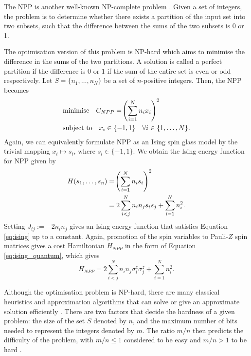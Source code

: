         The NPP is another well-known NP-complete problem \cite{karp2010reducibility}. Given a set of integers, the problem is to determine whether there exists a partition of the input set into two subsets, such that the difference between the sums of the two subsets is 0 or 1.

        The optimisation version of this problem is NP-hard which aims to minimise the difference in the sums of the two partitions. A solution is called a perfect partition if the difference is 0 or 1 if the sum of the entire set is even or odd respectively. Let $S=\{n_1,\dots,n_N\}$ be a set of $n$-positive integers. Then, the NPP becomes
        \begin{align}
        \begin{split}
                &\text{minimise} \quad  C_{NPP}=\lr(){\sum_{i=1}^Nn_ix_i}^2 \\
                &\text{subject to} \quad x_i\in\{-1,1\}\quad\forall i\in\{1,\dots,N\}.
        \end{split}
        \end{align}
        Again, we can equivalently formulate NPP as an Ising spin glass model by the trivial mapping $x_i\mapsto s_i$, where $s_i\in\{-1,1\}$. We obtain the Ising energy function for NPP given by 
        \begin{align}
            \begin{split}
                H(s_1,\dots,s_n) &= \lr(){\sum^N_{i=1}n_is_i}^2 \\
                &= 2\sum^N_{i<j} n_in_js_is_j + \sum^N_{i=1}n_i^2.
            \end{split}
        \end{align}
        Setting $J_{ij}:=-2n_in_j$ gives an Ising energy function that satisfies Equation \ref{eq:ising} up to a constant. Again, promotion of the spin variables to Pauli-$Z$ spin matrices gives a cost Hamiltonian $H_{NPP}$ in the form of Equation \ref{eq:ising_quantum}, which gives
        \begin{equation}
            H_{NPP} = 2\sum^N_{i<j} n_in_j\sigma^z_i\sigma^z_j + \sum^N_{i=1}n_i^2.
        \end{equation}

        Although the optimisation problem is NP-hard, there are many classical heuristics and approximation algorithms that can solve or give an approximate solution efficiently \cite{korf2009multi}. There are two factors that decide the hardness of a given problem: the size of the set $S$ denoted by $n$, and the maximum number of bits needed to represent the integers denoted by $m$. The ratio $m/n$ then predicts the difficulty of the problem, with $m/n\leq 1$ considered to be easy and $m/n>1$ to be hard \cite{hayes2002computing}.
